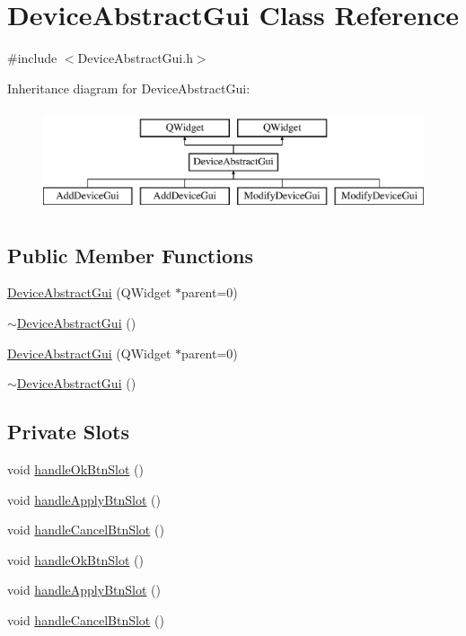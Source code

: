 \hypertarget{class_device_abstract_gui}{\section{Device\-Abstract\-Gui Class Reference}
\label{class_device_abstract_gui}
}


{\ttfamily \#include $<$Device\-Abstract\-Gui.\-h$>$}

Inheritance diagram for Device\-Abstract\-Gui\-:\begin{figure}[H]
\begin{center}
\leavevmode
\includegraphics[height=3.000000cm]{class_device_abstract_gui}
\end{center}
\end{figure}
\subsection*{Public Member Functions}
\begin{DoxyCompactItemize}
\item 
\hyperlink{class_device_abstract_gui_aa1167835f5c42dcb011375e2cce89df3}{Device\-Abstract\-Gui} (Q\-Widget $\ast$parent=0)
\item 
\hyperlink{class_device_abstract_gui_a33f3b331c88a4efdfc8f2c8f3167976f}{$\sim$\-Device\-Abstract\-Gui} ()
\item 
\hyperlink{class_device_abstract_gui_aa1167835f5c42dcb011375e2cce89df3}{Device\-Abstract\-Gui} (Q\-Widget $\ast$parent=0)
\item 
\hyperlink{class_device_abstract_gui_a33f3b331c88a4efdfc8f2c8f3167976f}{$\sim$\-Device\-Abstract\-Gui} ()
\end{DoxyCompactItemize}
\subsection*{Private Slots}
\begin{DoxyCompactItemize}
\item 
void \hyperlink{class_device_abstract_gui_a5b4b32e83ca956401c879b968375c2a0}{handle\-Ok\-Btn\-Slot} ()
\item 
void \hyperlink{class_device_abstract_gui_a67db5b814f7e1c399dda1e535fd3cd30}{handle\-Apply\-Btn\-Slot} ()
\item 
void \hyperlink{class_device_abstract_gui_a071a516d85528f150713f5df2373e8c5}{handle\-Cancel\-Btn\-Slot} ()
\item 
void \hyperlink{class_device_abstract_gui_a5b4b32e83ca956401c879b968375c2a0}{handle\-Ok\-Btn\-Slot} ()
\item 
void \hyperlink{class_device_abstract_gui_a67db5b814f7e1c399dda1e535fd3cd30}{handle\-Apply\-Btn\-Slot} ()
\item 
void \hyperlink{class_device_abstract_gui_a071a516d85528f150713f5df2373e8c5}{handle\-Cancel\-Btn\-Slot} ()
\end{DoxyCompactItemize}
